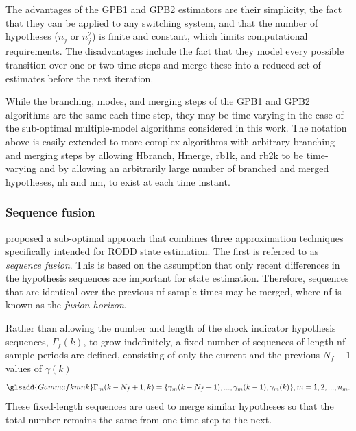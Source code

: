The advantages of the \gls{GPB1} and \gls{GPB2} estimators are their simplicity, the fact that they can be applied to any switching system, and that the number of hypotheses ($n_j$ or $n_j^2$) is finite and constant, which limits computational requirements. The disadvantages include the fact that they model every possible transition over one or two time steps and merge these into a reduced set of estimates before the next iteration. 

While the branching, modes, and merging steps of the \gls{GPB1} and \gls{GPB2} algorithms are the same each time step, they may be time-varying in the case of the sub-optimal multiple-model algorithms considered in this work. The notation above is easily extended to more complex algorithms with arbitrary branching and merging steps by allowing \gls{Hbranch}, \gls{Hmerge}, \gls{rb1k}, and \gls{rb2k} to be time-varying and by allowing an arbitrarily large number of branched and merged hypotheses, \gls{nh} and \gls{nm}, to exist at each time instant.

\subsubsection{Sequence fusion} \label{subsec-fusion}

\cite{robertson_detection_1995} proposed a sub-optimal approach that combines three approximation techniques specifically intended for \gls{RODD} state estimation. The first is referred to as \textit{sequence fusion}. This is based on the assumption that only recent differences in the hypothesis sequences are important for state estimation. Therefore, sequences that are identical over the previous \gls{nf} sample times may be merged, where \gls{nf} is known as the \textit{fusion horizon}.

Rather than allowing the number and length of the shock indicator hypothesis sequences, $\Gamma_f(k)$, to grow indefinitely, a fixed number of sequences of length \gls{nf} sample periods are defined, consisting of only the current and the previous $N_f-1$ values of $\gamma(k)$
\begin{equation} \label{eq:Gamma_kmf_k}
	\glsadd{Gammafkmnk}\Gamma_m(k-N_f+1,k)=\{\gamma_m(k-N_f+1), ...,  \gamma_m(k-1), \gamma_m(k)\}, m=1,2,...,n_m.
\end{equation}
These fixed-length sequences are used to merge similar hypotheses so that the total number remains the same from one time step to the next.

